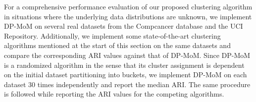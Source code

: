 \documentclass{article}
\begin{document}

For a comprehensive performance evaluation of our proposed clustering algorithm in situations where the underlying data distributions are unknown, we implement DP-MoM on several real datasets from the Compcancer database and the UCI Repository. Additionally, we implement some state-of-the-art clustering algorithms mentioned at the start of this section on the same datasets and compare the corresponding ARI values against that of DP-MoM. Since DP-MoM is a randomized algorithm in the sense that its cluster assignment is dependent on the initial dataset partitioning into buckets, we implement DP-MoM on each dataset $30$ times independently and report the median ARI. The same procedure is followed while reporting the ARI values for the competing algorithms.
\end{document}
